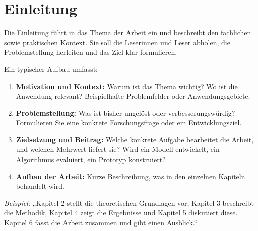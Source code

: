 \chapter{Einleitung}\label{ch:einleitung}

Die Einleitung führt in das Thema der Arbeit ein und beschreibt den fachlichen sowie praktischen Kontext.
Sie soll die Leserinnen und Leser abholen, die Problemstellung herleiten und das Ziel klar formulieren.

Ein typischer Aufbau umfasst:

\begin{enumerate}
\item \textbf{Motivation und Kontext:} Warum ist das Thema wichtig? Wo ist die Anwendung relevant? Beispielhafte Problemfelder oder Anwendungsgebiete.
\item \textbf{Problemstellung:} Was ist bisher ungelöst oder verbesserungswürdig? Formulieren Sie eine konkrete Forschungsfrage oder ein Entwicklungsziel.
\item \textbf{Zielsetzung und Beitrag:} Welche konkrete Aufgabe bearbeitet die Arbeit, und welchen Mehrwert liefert sie? Wird ein Modell entwickelt, ein Algorithmus evaluiert, ein Prototyp konstruiert?
\item \textbf{Aufbau der Arbeit:} Kurze Beschreibung, was in den einzelnen Kapiteln behandelt wird.
\end{enumerate}

\textit{Beispiel:} „Kapitel 2 stellt die theoretischen Grundlagen vor, Kapitel 3 beschreibt die Methodik, Kapitel 4 zeigt die Ergebnisse und Kapitel 5 diskutiert diese.
Kapitel 6 fasst die Arbeit zusammen und gibt einen Ausblick.“




